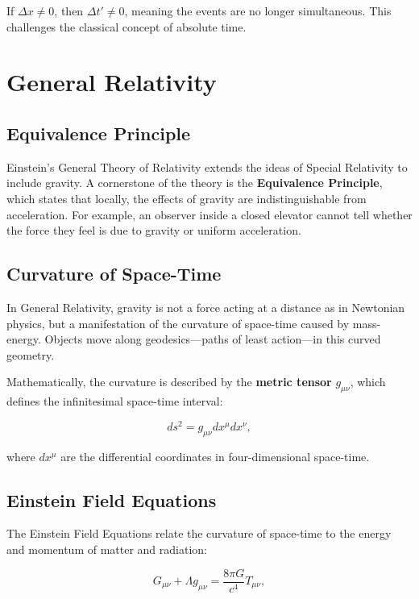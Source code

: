 \documentclass[12pt,a4paper]{article}
\begin{document}
If $\Delta x \neq 0$, then $\Delta t' \neq 0$, meaning the events are
no longer simultaneous. This challenges the classical concept of
absolute time.

\section{General Relativity}

\subsection{Equivalence Principle}

Einstein's General Theory of Relativity extends the ideas of Special Relativity
to include gravity. A cornerstone of the theory is the \textbf{Equivalence Principle},
which states that locally, the effects of gravity are indistinguishable from
acceleration. For example, an observer inside a closed elevator cannot tell
whether the force they feel is due to gravity or uniform acceleration.

\subsection{Curvature of Space-Time}

In General Relativity, gravity is not a force acting at a distance as in Newtonian
physics, but a manifestation of the curvature of space-time caused by mass-energy.
Objects move along geodesics—paths of least action—in this curved geometry.

Mathematically, the curvature is described by the \textbf{metric tensor} $g_{\mu\nu}$,
which defines the infinitesimal space-time interval:

\begin{equation}
  ds^2 = g_{\mu\nu} dx^\mu dx^\nu,
\end{equation}

where $dx^\mu$ are the differential coordinates in four-dimensional space-time.

\subsection{Einstein Field Equations}

The Einstein Field Equations relate the curvature of space-time to the energy
and momentum of matter and radiation:

\begin{equation}
  G_{\mu\nu} + \Lambda g_{\mu\nu} = \frac{8 \pi G}{c^4} T_{\mu\nu},
\end{equation}
\end{document}
